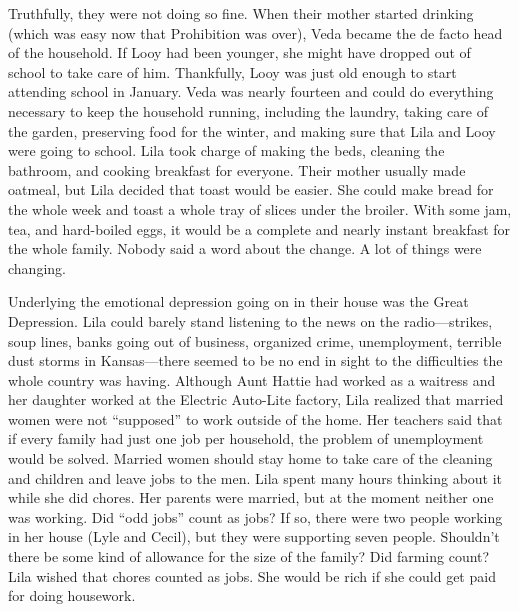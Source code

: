 \documentclass[
  american,
  letterpaper,
]{book}
\begin{document}
Truthfully, they were not doing so fine. When their mother started
drinking (which was easy now that Prohibition was over), Veda became the
de facto head of the household. If Looy had been younger, she might have
dropped out of school to take care of him. Thankfully, Looy was just old
enough to start attending school in January. Veda was nearly fourteen
and could do everything necessary to keep the household running,
including the laundry, taking care of the garden, preserving food for
the winter, and making sure that Lila and Looy were going to school.
Lila took charge of making the beds, cleaning the bathroom, and cooking
breakfast for everyone. Their mother usually made oatmeal, but Lila
decided that toast would be easier. She could make bread for the whole
week and toast a whole tray of slices under the broiler. With some jam,
tea, and hard-boiled eggs, it would be a complete and nearly instant
breakfast for the whole family. Nobody said a word about the change. A
lot of things were changing.

Underlying the emotional depression going on in their house was the
Great Depression. Lila could barely stand listening to the news on the
radio---strikes, soup lines, banks going out of business, organized
crime, unemployment, terrible dust storms in Kansas---there seemed to be
no end in sight to the difficulties the whole country was having.
Although Aunt Hattie had worked as a waitress and her daughter worked at
the Electric Auto-Lite factory, Lila realized that married women were
not ``supposed'' to work outside of the home. Her teachers said that if
every family had just one job per household, the problem of unemployment
would be solved. Married women should stay home to take care of the
cleaning and children and leave jobs to the men. Lila spent many hours
thinking about it while she did chores. Her parents were married, but at
the moment neither one was working. Did ``odd jobs'' count as jobs? If
so, there were two people working in her house (Lyle and Cecil), but
they were supporting seven people. Shouldn't there be some kind of
allowance for the size of the family? Did farming count? Lila wished
that chores counted as jobs. She would be rich if she could get paid for
doing housework.
\end{document}

